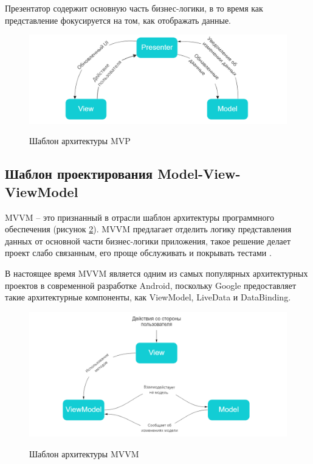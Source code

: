 Презентатор содержит основную часть бизнес-логики, в то время как представление фокусируется на том, как отображать данные.

\begin{figure}[h!]
    \begin{center}
        \includegraphics[width=0.95\hsize]{fig/mvp.png}\\[2mm]
        \caption{Шаблон архитектуры MVP}\label{fig:MVP}
    \end{center}
\end{figure}



\subsection{Шаблон проектирования Model-View-ViewModel}

MVVM -- это признанный в отрасли шаблон архитектуры программного обеспечения (рисунок \ref{fig:MVVM}). MVVM предлагает отделить логику представления данных от основной части бизнес-логики приложения, такое решение делает проект слабо связанным, его проще обслуживать и покрывать тестами \cite{book:21}.

В настоящее время MVVM является одним из самых популярных архитектурных проектов в современной разработке Android, поскольку Google предоставляет такие архитектурные компоненты, как ViewModel, LiveData и DataBinding.

\begin{figure}[h!]
    \begin{center}
        \includegraphics[width=0.95\hsize]{fig/mvvm.png}\\[2mm]
        \caption{Шаблон архитектуры MVVM}\label{fig:MVVM}
    \end{center}
\end{figure}

